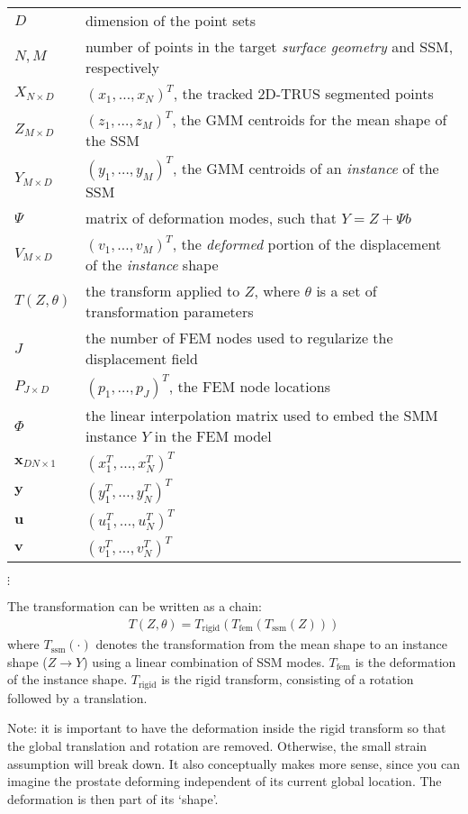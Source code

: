 \documentclass[10pt]{article}
\newcommand{\trans}[1]{#1^{T}}
\newcommand{\uvec}{\bm{u}}
\newcommand{\xvec}{\bm{x}}
\newcommand{\yvec}{\bm{y}}
\newcommand{\vvec}{\bm{v}}
\begin{document}
\noindent\begin{tabular}{lp{}}
  \hline
  $D$ & dimension of the point sets\\
  $N, M$ & number of points in the target \emph{surface geometry} and SSM, respectively\\
  $X_{N\times D}$ & $(x_1,\ldots,x_N)^T$, the tracked 2D-TRUS segmented points\\
  $Z_{M\times D}$ & $(z_1,\ldots,z_M)^T$, the GMM centroids for the mean shape of the SSM\\
  $Y_{M\times D}$ & $(y_1,\ldots,y_M)^T$, the GMM centroids of an \emph{instance} of the SSM\\
  $\Psi$ & matrix of deformation modes, such that $Y=Z+\Psi b$\\
  $V_{M\times D}$ & $(v_1,\ldots,v_M)^T$, the \emph{deformed} portion of the displacement of the \emph{instance} shape\\
  $T(Z,\theta)$ & the transform applied to $Z$, where $\theta$ is a set of transformation parameters\\
  \hline
  $J$ & the number of FEM nodes used to regularize the displacement field\\
  $P_{J\times D}$ & $(p_1,\ldots,p_J)^T$, the FEM node locations\\
  $\Phi$ & the linear interpolation matrix used to embed the SMM instance $Y$ in the FEM model\\
  \hline
  $\xvec_{DN\times 1}$ & $(\trans{x}_1,\ldots,\trans{x}_N)^T$\\
  $\yvec$ & $(\trans{y}_1,\ldots,\trans{y}_N)^T$\\
  $\uvec$ & $(\trans{u}_1,\ldots,\trans{u}_N)^T$\\
  $\vvec$ & $(\trans{v}_1,\ldots,\trans{v}_N)^T$\\
\end{tabular}

$\vdots$

The transformation can be written as a chain:
\begin{align}
  T(Z,\theta) = T_\mathrm{rigid}\left(T_\mathrm{fem}\left(T_\mathrm{ssm}(Z)\right)\right)
\end{align}
where $T_\mathrm{ssm}(\cdot)$ denotes the transformation from the mean shape to an instance shape ($Z\to Y$) using a linear
combination of SSM modes. $T_\mathrm{fem}$ is the deformation of the instance shape.  $T_\mathrm{rigid}$ is the rigid transform,
consisting of a rotation followed by a translation.

Note: it is important to have the deformation inside the rigid transform so that the global translation and rotation are removed.  Otherwise, the small
strain assumption will break down.  It also conceptually makes more sense, since you can imagine the prostate deforming
independent of its current global location.  The deformation is then part of its `shape'.
\end{document}
